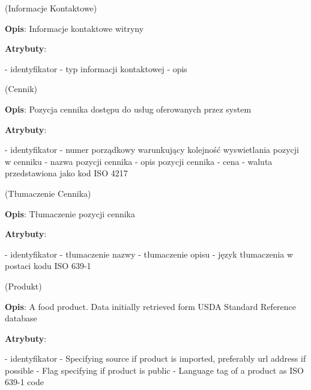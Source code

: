 \begin{enumerate}[label={\textbf{KAT/\protect\threedigits{\theenumi}}}, wide, labelwidth=!, labelindent=0pt, labelsep=0pt, series=reqs]
     \label{kat:ContactInfo} (Informacje Kontaktowe)

    \textbf{Opis}: Informacje kontaktowe witryny
    \par
    \textbf{Atrybuty}:
    \begin{itemize}[series=atr, wide, align=left, leftmargin=190pt]
         \label{kat:ContactInfo:id} - identyfikator
         \label{kat:ContactInfo:contactInfoType} - typ informacji kontaktowej
         \label{kat:ContactInfo:description} - opis
    \end{itemize}

     \label{kat:Pricing} (Cennik)

    \textbf{Opis}: Pozycja cennika dostępu do usług oferowanych przez system
    \par
    \textbf{Atrybuty}:
    \begin{itemize}[series=atr, wide, align=left, leftmargin=190pt]
         \label{kat:Pricing:id} - identyfikator
         \label{kat:Pricing:ordinalNumber} - numer porządkowy warunkujący kolejność wyswietlania pozycji w cenniku
         \label{kat:Pricing:title} - nazwa pozycji cennika
         \label{kat:Pricing:description} - opis pozycji cennika
         \label{kat:Pricing:price} - cena
         \label{kat:Pricing:currency} - waluta przedstawiona jako kod ISO 4217
    \end{itemize}

     \label{kat:PricingTranslation} (Tłumaczenie Cennika)

    \textbf{Opis}: Tłumaczenie pozycji cennika
    \par
    \textbf{Atrybuty}:
    \begin{itemize}[series=atr, wide, align=left, leftmargin=190pt]
         \label{kat:PricingTranslation:id} - identyfikator
         \label{kat:PricingTranslation:title} - tłumaczenie nazwy
         \label{kat:PricingTranslation:description} - tłumaczenie opisu
         \label{kat:PricingTranslation:language} - język tłumaczenia w postaci kodu ISO 639-1
    \end{itemize}

     \label{kat:Product} (Produkt)

    \textbf{Opis}: A food product. Data initially retrieved form USDA Standard Reference database
    \par
    \textbf{Atrybuty}:
    \begin{itemize}[series=atr, wide, align=left, leftmargin=190pt]
         \label{kat:Product:id} - identyfikator
         \label{kat:Product:source} - Specifying source if product is imported, preferably url address if possible
         \label{kat:Product:isPublic} - Flag specifying if product is public
         \label{kat:Product:language} - Language tag of a product as ISO 639-1 code
    \end{itemize}


\end{enumerate}
